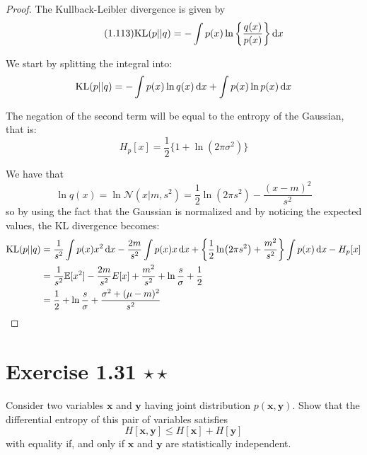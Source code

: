 \begin{proof}
    The Kullback-Leibler divergence is given by 
    \begin{equation}\label{eq:1.113}\tag{1.113}
        \text{KL}(p || q) = - \int p(x) \ln \bigg\{ \frac{q(x)}{p(x)} \bigg\} \mathop{}\!\mathrm{d} x
    \end{equation}

    We start by splitting the integral into:
    \[
        \text{KL}(p || q) = 
            -\int p(x) \ln q(x) \mathop{}\!\mathrm{d} x + \int p(x) \ln p(x) \mathop{}\!\mathrm{d} x
    \] 

    The negation of the second term will be equal to the entropy of the Gaussian,
    that is:
    \begin{equation}\label{eq:1.110}\tag{1.110}
        H_p[x] = \frac{1}{2} \{1 + \ln (2\pi \sigma^2)\}
    \end{equation}

    We have that
    \[
        \ln q(x) = \ln \mathcal{N} (x | m, s^2) = \frac{1}{2} \ln(2\pi s^2) - \frac{(x - m)^2}{s^2}
    \] 
    so by using the fact that the Gaussian is normalized and by noticing the expected
    values, the KL divergence becomes:
    \begin{align*}
        \text{KL}(p || q) 
        &= \frac{1}{s^2}\int p(x) x^2 \mathop{}\!\mathrm{d} x - \frac{2m}{s^2} \int p(x) x \mathop{}\!\mathrm{d} x 
        + \bigg\{\frac{1}{2} \ln(2\pi s^2) + \frac{m^2}{s^2}\bigg\} \int p(x) \mathop{}\!\mathrm{d} x
        - H_p[x] \\
        &= \frac{1}{s^2} \mathbb{E}[x^2] - \frac{2m}{s^2}E[x] 
        + \frac{m^2}{s^2} + \ln \frac{s}{\sigma} + \frac{1}{2} \\
        &= \frac{1}{2} + \ln \frac{s}{\sigma} + \frac{\sigma^2 + (\mu - m)^2}{s^2}
    \end{align*}
\end{proof}

\section*{Exercise 1.31 $\star \star$}
Consider two variables $\mathbf{x}$ and $\mathbf{y}$ having joint distribution
$p(\mathbf{x}, \mathbf{y})$. Show that the differential entropy of this pair of 
variables satisfies
\begin{equation}\label{eq:1.152}\tag{1.152}
    H[\mathbf{x}, \mathbf{y}] \leq H[\mathbf{x}] + H[\mathbf{y}]
\end{equation}
with equality if, and only if $\mathbf{x}$ and $\mathbf{y}$ are statistically
independent.

